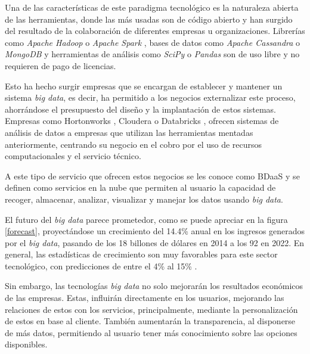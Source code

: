 Una de las características de este paradigma tecnológico es la naturaleza abierta de las herramientas, donde las más usadas son de código abierto y han surgido del resultado de la colaboración de diferentes empresas u organizaciones. Librerías como \textit{Apache Hadoop} \cite{hadoop} o \textit{Apache Spark} \cite{spark}, bases de datos como \textit{Apache Cassandra} \cite{cassandra} o \textit{MongoDB} \cite{mongo} y herramientas de análisis como \textit{SciPy} \cite{scipy} o \textit{Pandas} \cite{pandas} son de uso libre y no requieren de pago de licencias.

Esto ha hecho surgir empresas que se encargan de establecer y mantener un sistema \textit{big data}, es decir, ha permitido a los negocios externalizar este proceso, ahorrándose el presupuesto del diseño y la implantación de estos sistemas. Empresas como Hortonworks \cite{horton}, Cloudera \cite{cloudera} o Databricks \cite{databricks}, ofrecen sistemas de análisis de datos a empresas que utilizan las herramientas mentadas anteriormente, centrando su negocio en el cobro por el uso de recursos computacionales y el servicio técnico.

A este tipo de servicio que ofrecen estos negocios se les conoce como \gls{BDaaS} y se definen como servicios en la nube que permiten al usuario la capacidad de recoger, almacenar, analizar, visualizar y manejar los datos usando \textit{big data}.

El futuro del \textit{big data} parece prometedor, como se puede apreciar en la figura \ref{forecast}, proyectándose un crecimiento del 14.4\% anual en los ingresos generados por el \textit{big data}, pasando de los 18 billones de dólares en 2014 a los 92 en 2022. En general, las estadísticas de crecimiento son muy favorables para este sector tecnológico, con predicciones de entre el 4\% al 15\% \cite{forecast}.

Sin embargo, las tecnologías \textit{big data} no solo mejorarán los resultados económicos de las empresas. Estas, influirán directamente en los usuarios, mejorando las relaciones de estos con los servicios, principalmente, mediante la personalización de estos en base al cliente. También aumentarán la transparencia, al disponerse de más datos, permitiendo al usuario tener más conocimiento sobre las opciones disponibles.


